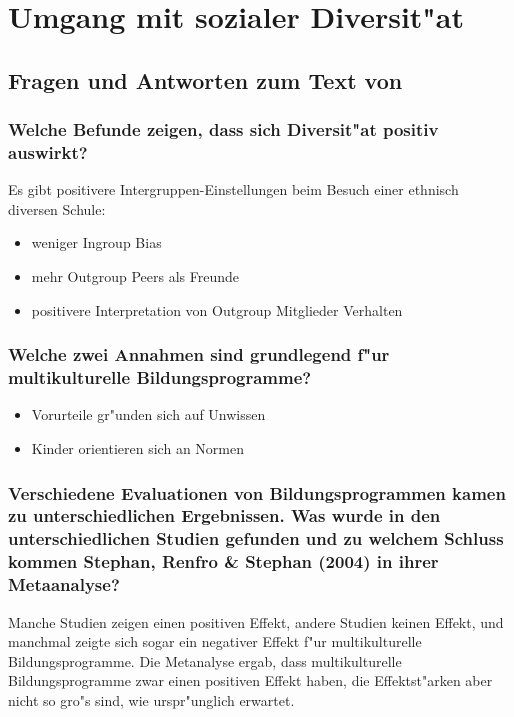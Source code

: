 \section{Umgang mit sozialer Diversit"at}
\subsection{Fragen und Antworten zum Text von \textcite{cameron_application_2010}}
\subsubsection{Welche Befunde zeigen, dass sich Diversit"at positiv auswirkt?}
Es gibt positivere Intergruppen-Einstellungen beim Besuch einer ethnisch diversen Schule:
\begin{itemize}
        \item weniger Ingroup Bias
        \item mehr Outgroup Peers als Freunde
        \item positivere Interpretation von Outgroup Mitglieder Verhalten
\end{itemize}

\subsubsection{Welche zwei Annahmen sind grundlegend f"ur multikulturelle Bildungsprogramme?}
\begin{itemize}
        \item Vorurteile gr"unden sich auf Unwissen
        \item Kinder orientieren sich an Normen
\end{itemize}

\subsubsection{Verschiedene Evaluationen von Bildungsprogrammen kamen zu unterschiedlichen Ergebnissen. Was wurde in den unterschiedlichen Studien gefunden und zu welchem Schluss kommen Stephan, Renfro \& Stephan (2004) in ihrer Metaanalyse?}
Manche Studien zeigen einen positiven Effekt, andere Studien keinen Effekt, und manchmal zeigte sich sogar ein negativer Effekt f"ur multikulturelle Bildungsprogramme. Die Metanalyse ergab, dass multikulturelle Bildungsprogramme zwar einen positiven Effekt haben, die Effektst"arken aber nicht so gro"s sind, wie urspr"unglich erwartet.

